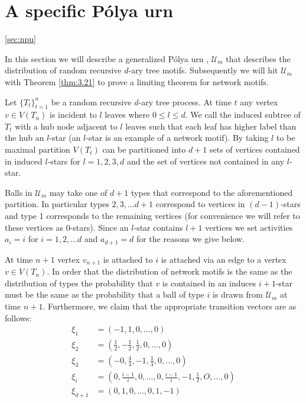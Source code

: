 \documentclass[oneside]{book} %
\theoremstyle{definition}
\numberwithin{equation}{section}
\begin{document}
\section{A specific P\'{o}lya urn}\ref{sec:npu}

In this section we will describe a generalized P\'{o}lya urn , $\mathcal{U}_m$ that describes the distribution of random recursive $d$-ary tree motifs.  Subsequently we will hit $\mathcal{U}_m$ with Theorem \ref{thm:3.21} to prove a limiting theorem for network motifs.

Let $\{T_t\}_{t=1}^{n}$ be a random recursive $d$-ary tree process.  At time $t$ any vertex $v \in V(T_n)$ is incident to $l$ leaves where $0 \leq l \leq d$.  We call the induced subtree of $T_t$ with a hub node adjacent to $l$ leaves such that each leaf has higher label than the hub an $l$-star (an $l$-star is an example of a network motif).  By taking $l$ to be maximal partition $V(T_t)$ can be partitioned into $d+1$ sets of vertices contained in induced $l$-stars for $l=1,2,3, d$ and the set of vertices not contained in any $l$-star.

Balls in $\mathcal{U}_m$  may take one of $d+1$ types that correspond to the aforementioned partition. In particular types $2,3,\dots d+1$ correspond to vertices in $(d-1)$-stars  and type 1 corresponds to the remaining vertices (for convenience we will refer to these vertices as 0-stars).  Since an $l$-star contains $l+1$ vertices we set activities $a_i = i$ for $i = 1,2,\dots d$ and $a_{d+1} = d$ for the reasons we give below.

At time $n+1$ vertex $v_{n+1}$ is attached to $i$ is attached via an edge to a vertex $v\in V(T_n)$.  In order that the distribution of network motifs is the same as the distribution of types the probability that $v$ is contained in an induces $i+1$-star must be the same as the probability that a ball of type $i$ is drawn from $\mathcal{U}_m$ at time $n+1$.  Furthermore, we claim that the appropriate transition vectors are as follows:
\begin{align*}
 \xi_{1} &= (-1,1,0,\dots,0) \\
 \xi_{2} &= (\frac{1}{2},-\frac{1}{2},\frac{1}{2},0,\dots,0) \\
 \xi_{3} &= (-0,\frac{4}{3},-1,\frac{1}{3},0,\dots,0) \\
 \xi_{i} &= (0,\frac{i-1}{i},0,\dots,0, \frac{i-1}{i},-1,\frac{1}{I},O,\dots,0) \\
 \xi_{d+1} &= (0,1,0,\dots,0,1,-1) \\
\end{align*}
\end{document}
